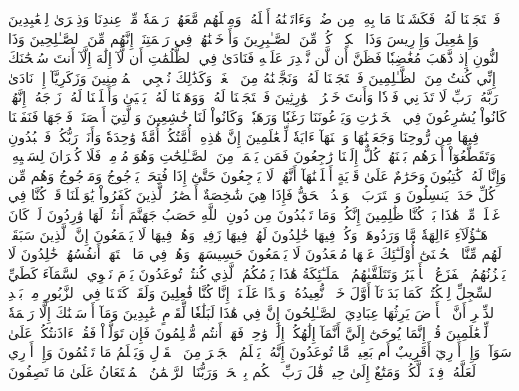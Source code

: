 فَٱسۡتَجَبۡنَا لَهُۥ فَكَشَفۡنَا مَا بِهِۦ مِن ضُرّٖۖ وَءَاتَيۡنَٰهُ أَهۡلَهُۥ وَمِثۡلَهُم مَّعَهُمۡ رَحۡمَةٗ مِّنۡ عِندِنَا وَذِكۡرَىٰ لِلۡعَٰبِدِينَ
وَإِسۡمَٰعِيلَ وَإِدۡرِيسَ وَذَا ٱلۡكِفۡلِۖ كُلّٞ مِّنَ ٱلصَّـٰبِرِينَ
وَأَدۡخَلۡنَٰهُمۡ فِي رَحۡمَتِنَآۖ إِنَّهُم مِّنَ ٱلصَّـٰلِحِينَ
وَذَا ٱلنُّونِ إِذ ذَّهَبَ مُغَٰضِبٗا فَظَنَّ أَن لَّن نَّقۡدِرَ عَلَيۡهِ فَنَادَىٰ فِي ٱلظُّلُمَٰتِ أَن لَّآ إِلَٰهَ إِلَّآ أَنتَ سُبۡحَٰنَكَ إِنِّي كُنتُ مِنَ ٱلظَّـٰلِمِينَ
فَٱسۡتَجَبۡنَا لَهُۥ وَنَجَّيۡنَٰهُ مِنَ ٱلۡغَمِّۚ وَكَذَٰلِكَ نُـۨجِي ٱلۡمُؤۡمِنِينَ
وَزَكَرِيَّآ إِذۡ نَادَىٰ رَبَّهُۥ رَبِّ لَا تَذَرۡنِي فَرۡدٗا وَأَنتَ خَيۡرُ ٱلۡوَٰرِثِينَ
فَٱسۡتَجَبۡنَا لَهُۥ وَوَهَبۡنَا لَهُۥ يَحۡيَىٰ وَأَصۡلَحۡنَا لَهُۥ زَوۡجَهُۥٓۚ إِنَّهُمۡ كَانُواْ يُسَٰرِعُونَ فِي ٱلۡخَيۡرَٰتِ وَيَدۡعُونَنَا رَغَبٗا وَرَهَبٗاۖ وَكَانُواْ لَنَا خَٰشِعِينَ
وَٱلَّتِيٓ أَحۡصَنَتۡ فَرۡجَهَا فَنَفَخۡنَا فِيهَا مِن رُّوحِنَا وَجَعَلۡنَٰهَا وَٱبۡنَهَآ ءَايَةٗ لِّلۡعَٰلَمِينَ
إِنَّ هَٰذِهِۦٓ أُمَّتُكُمۡ أُمَّةٗ وَٰحِدَةٗ وَأَنَا۠ رَبُّكُمۡ فَٱعۡبُدُونِ
وَتَقَطَّعُوٓاْ أَمۡرَهُم بَيۡنَهُمۡۖ كُلٌّ إِلَيۡنَا رَٰجِعُونَ
فَمَن يَعۡمَلۡ مِنَ ٱلصَّـٰلِحَٰتِ وَهُوَ مُؤۡمِنٞ فَلَا كُفۡرَانَ لِسَعۡيِهِۦ وَإِنَّا لَهُۥ كَٰتِبُونَ
وَحَرَٰمٌ عَلَىٰ قَرۡيَةٍ أَهۡلَكۡنَٰهَآ أَنَّهُمۡ لَا يَرۡجِعُونَ
حَتَّىٰٓ إِذَا فُتِحَتۡ يَأۡجُوجُ وَمَأۡجُوجُ وَهُم مِّن كُلِّ حَدَبٖ يَنسِلُونَ
وَٱقۡتَرَبَ ٱلۡوَعۡدُ ٱلۡحَقُّ فَإِذَا هِيَ شَٰخِصَةٌ أَبۡصَٰرُ ٱلَّذِينَ كَفَرُواْ يَٰوَيۡلَنَا قَدۡ كُنَّا فِي غَفۡلَةٖ مِّنۡ هَٰذَا بَلۡ كُنَّا ظَٰلِمِينَ
إِنَّكُمۡ وَمَا تَعۡبُدُونَ مِن دُونِ ٱللَّهِ حَصَبُ جَهَنَّمَ أَنتُمۡ لَهَا وَٰرِدُونَ
لَوۡ كَانَ هَـٰٓؤُلَآءِ ءَالِهَةٗ مَّا وَرَدُوهَاۖ وَكُلّٞ فِيهَا خَٰلِدُونَ
لَهُمۡ فِيهَا زَفِيرٞ وَهُمۡ فِيهَا لَا يَسۡمَعُونَ
إِنَّ ٱلَّذِينَ سَبَقَتۡ لَهُم مِّنَّا ٱلۡحُسۡنَىٰٓ أُوْلَـٰٓئِكَ عَنۡهَا مُبۡعَدُونَ
لَا يَسۡمَعُونَ حَسِيسَهَاۖ وَهُمۡ فِي مَا ٱشۡتَهَتۡ أَنفُسُهُمۡ خَٰلِدُونَ
لَا يَحۡزُنُهُمُ ٱلۡفَزَعُ ٱلۡأَكۡبَرُ وَتَتَلَقَّىٰهُمُ ٱلۡمَلَـٰٓئِكَةُ هَٰذَا يَوۡمُكُمُ ٱلَّذِي كُنتُمۡ تُوعَدُونَ
يَوۡمَ نَطۡوِي ٱلسَّمَآءَ كَطَيِّ ٱلسِّجِلِّ لِلۡكُتُبِۚ كَمَا بَدَأۡنَآ أَوَّلَ خَلۡقٖ نُّعِيدُهُۥۚ وَعۡدًا عَلَيۡنَآۚ إِنَّا كُنَّا فَٰعِلِينَ
وَلَقَدۡ كَتَبۡنَا فِي ٱلزَّبُورِ مِنۢ بَعۡدِ ٱلذِّكۡرِ أَنَّ ٱلۡأَرۡضَ يَرِثُهَا عِبَادِيَ ٱلصَّـٰلِحُونَ
إِنَّ فِي هَٰذَا لَبَلَٰغٗا لِّقَوۡمٍ عَٰبِدِينَ
وَمَآ أَرۡسَلۡنَٰكَ إِلَّا رَحۡمَةٗ لِّلۡعَٰلَمِينَ
قُلۡ إِنَّمَا يُوحَىٰٓ إِلَيَّ أَنَّمَآ إِلَٰهُكُمۡ إِلَٰهٞ وَٰحِدٞۖ فَهَلۡ أَنتُم مُّسۡلِمُونَ
فَإِن تَوَلَّوۡاْ فَقُلۡ ءَاذَنتُكُمۡ عَلَىٰ سَوَآءٖۖ وَإِنۡ أَدۡرِيٓ أَقَرِيبٌ أَم بَعِيدٞ مَّا تُوعَدُونَ
إِنَّهُۥ يَعۡلَمُ ٱلۡجَهۡرَ مِنَ ٱلۡقَوۡلِ وَيَعۡلَمُ مَا تَكۡتُمُونَ
وَإِنۡ أَدۡرِي لَعَلَّهُۥ فِتۡنَةٞ لَّكُمۡ وَمَتَٰعٌ إِلَىٰ حِينٖ
قَٰلَ رَبِّ ٱحۡكُم بِٱلۡحَقِّۗ وَرَبُّنَا ٱلرَّحۡمَٰنُ ٱلۡمُسۡتَعَانُ عَلَىٰ مَا تَصِفُونَ
